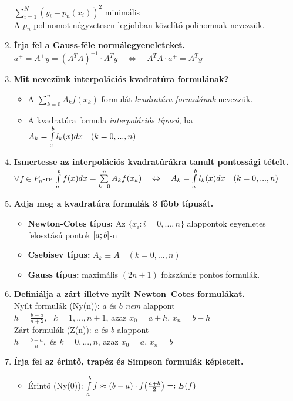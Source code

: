 \documentclass{article}
\begin{document}
\begin{enumerate}
	{\Large $\sum\limits_{i=1}^{N}(y_i-p_n(x_i))^2$ minimális}\\[0.1cm]
	A $p_n$ polinomot négyzetesen legjobban közelítő polinomnak nevezzük.
	\item\textbf{Írja fel a Gauss-féle normálegyeneleteket.}\\[0.1cm]
	{\Large $a^+=A^+y=(A^TA)^{-1}\cdot A^Ty\quad\Leftrightarrow\quad A^TA\cdot a^+=A^Ty$}
	\newpage
	\item\textbf{Mit nevezünk interpolációs kvadratúra formulának?}
	\begin{itemize}
		\item A $\sum\limits_{k=0}^{n}A_kf(x_k)$ formulát \textit{kvadratúra formulának} nevezzük.
		\item A kvadratúra formula \textit{interpolációs típusú}, ha
		$A_k=\int\limits_{a}^{b} l_k(x)dx\quad(k=0,...,n)$
	\end{itemize}
	\item\textbf{Ismertesse az interpolációs kvadratúrákra tanult pontossági tételt.}\\[0.1cm]
	$\forall f\in P_n$-re $\int\limits_{a}^{b} f(x)dx=\sum\limits_{k=0}^{n}A_kf(x_k)\quad\Leftrightarrow
	\quad A_k=\int\limits_{a}^{b} l_k(x)dx\quad(k=0,...,n)$
	\item\textbf{Adja meg a kvadratúra formulák 3 főbb típusát.}
	\begin{itemize}
		\item\textbf{Newton-Cotes típus:} Az $\{x_i:i=0,...,n\}$ alappontok egyenletes
		felosztású pontok $[a;b]$-n
		\item\textbf{Csebisev típus:} $A_k\equiv A\quad(k=0,...,n)$
		\item\textbf{Gauss típus:} maximális $(2n+1)$ fokszámig pontos formulák.
	\end{itemize}
	\item\textbf{Definiálja a zárt illetve nyílt Newton–Cotes formulákat.}\\[0.1cm]
	Nyílt formulák (Ny(n)): $a$ és $b$ \textit{nem} alappont\\[0.1cm]
	$h=\frac{b-a}{n+2},\text{  }k=1,...,n+1$, azaz $x_0=a+h$, $x_n=b-h$\\[0.2cm]
	Zárt formulák (Z(n)): $a$ és $b$ alappont\\[0.1cm]
	$h=\frac{b-a}{n},\text{ és }k=0,...,n$, azaz $x_0=a$, $x_n=b$
	\item\textbf{Írja fel az érintő, trapéz és Simpson formulák képleteit.}
	\begin{itemize}
		\item Érintő (Ny(0)): $\int\limits_{a}^{b} f\approx(b-a)\cdot f\big(\frac{a+b}{2}\big)=:E(f)$

\end{itemize}
\end{enumerate}
\end{document}
